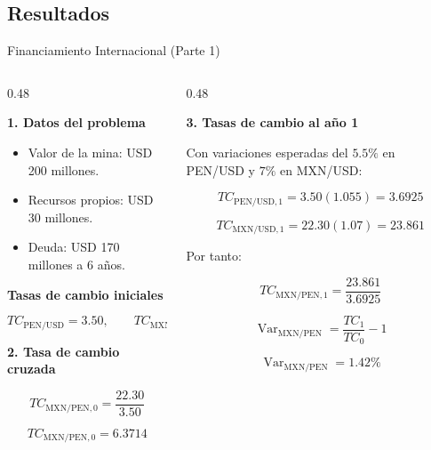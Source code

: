 \documentclass[10pt]{beamer}
\begin{document}
\subsection{Resultados}

\begin{frame}{Financiamiento Internacional (Parte 1)}

\small

\begin{columns}[T,onlytextwidth]

\begin{column}{0.48\textwidth}

\textbf{1. Datos del problema}

\begin{itemize}
    \item Valor de la mina: USD 200 millones.
    \item Recursos propios: USD 30 millones.
    \item Deuda: USD 170 millones a 6 años.
\end{itemize}

\textbf{Tasas de cambio iniciales}

\[
TC_{\text{PEN/USD}}=3.50,\qquad
TC_{\text{MXN/USD}}=22.30
\]

\textbf{2. Tasa de cambio cruzada}

\[
TC_{\text{MXN/PEN},0}=\frac{22.30}{3.50}
\]

\[
\boxed{TC_{\text{MXN/PEN},0}=6.3714}
\]

\end{column}

\begin{column}{0.48\textwidth}

\textbf{3. Tasas de cambio al año 1}

Con variaciones esperadas del \(5.5\%\) en PEN/USD y \(7\%\) en MXN/USD:

\[
TC_{\text{PEN/USD},1}=3.50(1.055)=3.6925
\]

\[
TC_{\text{MXN/USD},1}=22.30(1.07)=23.861
\]

Por tanto:

\[
TC_{\text{MXN/PEN},1}=\frac{23.861}{3.6925}
\]

\[
\operatorname{Var}_{\text{MXN/PEN}}
=\frac{TC_1}{TC_0}-1
\]

\[
\boxed{\operatorname{Var}_{\text{MXN/PEN}}=1.42\%}
\]

\end{column}

\end{columns}

\end{frame}
\end{document}
